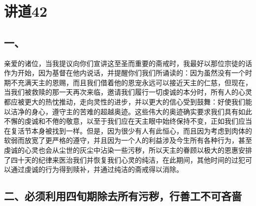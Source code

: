 

\section{讲道42}

\par


\subsection{一、}

亲爱的诸位，当我提议向你们宣讲这至圣而重要的斋戒时，我最好以那位宗徒的话作为开始，因为基督在他内说话，并提醒你们我们所诵读的：因为虽然没有一个时期不充满天主的恩赐，而且我们借着他的恩宠永远可以接近天主的仁慈，但现在，当我们被救赎的那一天再次来临，邀请我们履行一切虔诚的本分时，所有人的心灵都应被更大的热忱推动，走向灵性的进步，并以更大的信心受到鼓舞：好使我们能以洁净的身心，遵守主的苦难的超越奥迹。这些伟大的奥迹确实要求我们具有如此不懈的虔诚和不倦的敬意，以至于我们应在天主眼中始终保持不变，正如我们应当在复活节本身被找到一样。但是，因为很少有人有此恒心，而且因为考虑到肉体的软弱而放宽了更严格的遵守，并且因为一个人的利益涉及今生所有各种行为，甚至虔诚的心灵也会从尘世的灰尘中沾染一些污秽，所以天主的眷顾以极大的恩惠安排了四十天的纪律来医治我们并恢复我们心灵的纯洁，在此期间，其他时间的过犯可以通过虔诚的行为得到赎补，并通过纯洁的斋戒得以消除。\par


\subsection{二、必须利用四旬期除去所有污秽，行善工不可吝啬}

